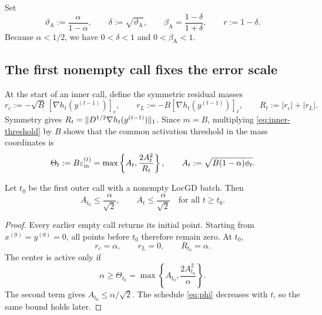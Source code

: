 \documentclass[11pt]{article}
\begin{document}
Set
\begin{equation}
  \vartheta_{\mathrm A}:=\frac{\alpha}{1-\alpha},
  \qquad
  \delta:=\sqrt{\vartheta_{\mathrm A}},
  \qquad
  \beta_{\mathrm A}=\frac{1-\delta}{1+\delta},
  \qquad
  r:=1-\delta.
  \label{eq:aesp-scale}
\end{equation}
Because $\alpha<1/2$, we have $0<\delta<1$ and $0<\beta_{\mathrm A}<1$.

\subsection{The first nonempty call fixes the error scale}

At the start of an inner call, define the symmetric residual masses
\begin{equation}
  r_c:=-\sqrt B\,[\nabla h_t(y^{(t-1)})]_c,
  \qquad
  r_L:=-B[\nabla h_t(y^{(t-1)})]_\ell,
  \qquad
  R_t:=|r_c|+|r_L|.
  \label{eq:mass-residuals}
\end{equation}
Symmetry gives
$R_t=\lVert D^{1/2}\nabla h_t(y^{(t-1)})\rVert_1$.  Since $m=B$, multiplying
\cref{eq:inner-threshold} by $B$ shows that the common activation threshold in
the mass coordinates is
\begin{equation}
  \Theta_t
  :=B\varepsilon_{\mathrm{in}}^{(t)}
  =\max\left\{A_t,\frac{2A_t^2}{R_t}\right\},
  \qquad
  A_t:=\sqrt{B(1-\alpha)\phi_t}.
  \label{eq:mass-threshold}
\end{equation}

\begin{lemma}
\label{lem:first-activation}
Let $t_0$ be the first outer call with a nonempty LocGD batch.  Then
\begin{equation}
  A_{t_0}\leq\frac{\alpha}{\sqrt2},
  \qquad
  A_t\leq\frac{\alpha}{\sqrt2}
  \quad\text{for all }t\geq t_0.
  \label{eq:A-bound}
\end{equation}
\end{lemma}

\begin{proof}
Every earlier empty call returns its initial point.  Starting from
$x^{(0)}=y^{(0)}=0$, all points before $t_0$ therefore remain zero.  At
$t_0$,
\[
  r_c=\alpha,
  \qquad
  r_L=0,
  \qquad
  R_{t_0}=\alpha.
\]
The center is active only if
\[
  \alpha\geq\Theta_{t_0}
  =\max\left\{A_{t_0},\frac{2A_{t_0}^2}{\alpha}\right\}.
\]
The second term gives $A_{t_0}\leq\alpha/\sqrt2$.  The schedule
\cref{eq:phi} decreases with $t$, so the same bound holds later.
\end{proof}
\end{document}
